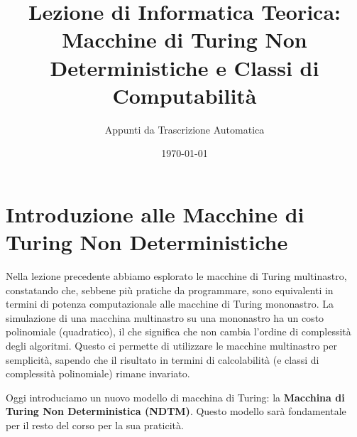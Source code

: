 \documentclass[a4paper]{article}
\title{Lezione di Informatica Teorica: Macchine di Turing Non Deterministiche e Classi di Computabilità}
\author{Appunti da Trascrizione Automatica}
\date{\today}
\begin{document}
\maketitle
\tableofcontents
\newpage

\section{Introduzione alle Macchine di Turing Non Deterministiche}

Nella lezione precedente abbiamo esplorato le macchine di Turing multinastro, constatando che, sebbene più pratiche da programmare, sono equivalenti in termini di potenza computazionale alle macchine di Turing mononastro. La simulazione di una macchina multinastro su una mononastro ha un costo polinomiale (quadratico), il che significa che non cambia l'ordine di complessità degli algoritmi. Questo ci permette di utilizzare le macchine multinastro per semplicità, sapendo che il risultato in termini di calcolabilità (e classi di complessità polinomiale) rimane invariato.

Oggi introduciamo un nuovo modello di macchina di Turing: la \textbf{Macchina di Turing Non Deterministica (NDTM)}. Questo modello sarà fondamentale per il resto del corso per la sua praticità.
\end{document}
